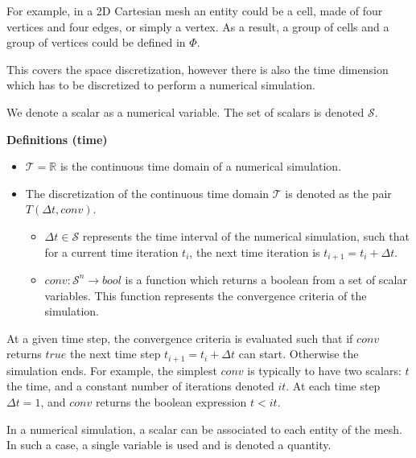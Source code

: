 For example, in a 2D Cartesian mesh an entity could be a cell, made of four vertices and four edges, or simply a vertex. As a result, a group of cells and a group of vertices could be defined in $\Phi$. %

\medskip
This covers the space discretization, however there is also the time dimension which has to be discretized to perform a numerical simulation.

\begin{mydef}
We denote a scalar as a numerical variable. The set of scalars is denoted $\mathcal{S}$.
\end{mydef}

\medskip
\noindent \textbf{Definitions (time)}
\begin{itemize}
\item $\mathcal{T}=\mathbb{R}$ is the continuous time domain of a numerical simulation.
\item The discretization of the continuous time domain $\mathcal{T}$ is denoted as the pair $T(\Delta t,conv)$.
\begin{itemize}
\item $\Delta t \in \mathcal{S}$ represents the time interval of the numerical simulation, such that for a current time iteration $t_i$, the next time iteration is $t_{i+1} = t_i + \Delta t$.
\item $conv:\mathcal{S}^n \rightarrow bool$ is a function which returns a boolean from a set of scalar variables. This function represents the convergence criteria of the simulation. 
\end{itemize}
\end{itemize}

At a given time step, the convergence criteria is evaluated such that if $conv$ returns $true$ the next time step $t_{i+1} = t_i + \Delta t$ can start. Otherwise the simulation ends. For example, the simplest $conv$ is typically to have two scalars: $t$ the time, and a constant number of iterations denoted $it$. At each time step $\Delta t=1$, and $conv$ returns the boolean expression $t<it$.

In a numerical simulation, a scalar can be associated to each entity of the mesh. In such a case, a single variable is used and is denoted a quantity.

